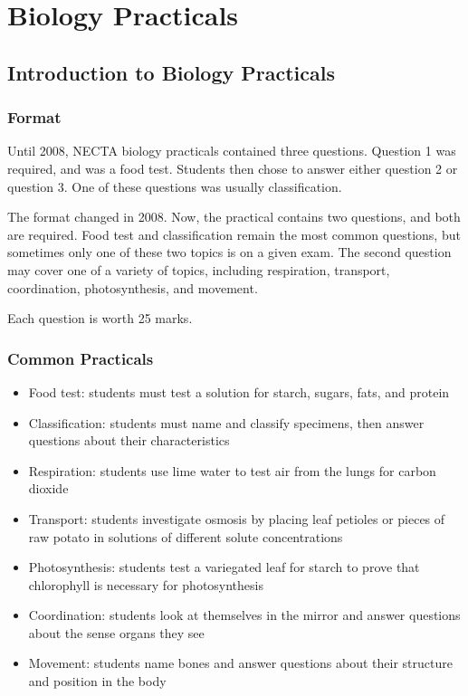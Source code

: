 \chapter{Biology Practicals}

\section{Introduction to Biology Practicals}

\subsection{Format}

Until 2008, NECTA biology practicals contained three questions. Question 1 was required, and was a food test. Students then chose to answer either question 2 or question 3. One of these questions was usually classification.

The format changed in 2008. Now, the practical contains two questions, and both are required. Food test and classification remain the most common questions, but sometimes only one of these two topics is on a given exam. The second question may cover one of a variety of topics, including respiration, transport, coordination, photosynthesis, and movement.

Each question is worth 25 marks.

\subsection{Common Practicals}
\begin{itemize}
\item{Food test: students must test a solution for starch, sugars, fats, and protein}
\item{Classification: students must name and classify specimens, then answer questions about their characteristics}
\item{Respiration: students use lime water to test air from the lungs for carbon dioxide}
\item{Transport: students investigate osmosis by placing leaf petioles or pieces of raw potato in solutions of different solute concentrations}
\item{Photosynthesis: students test a variegated leaf for starch to prove that chlorophyll is necessary for photosynthesis}
\item{Coordination: students look at themselves in the mirror and answer questions about the sense organs they see}
\item{Movement: students name bones and answer questions about their structure and position in the body}
\end{itemize}

